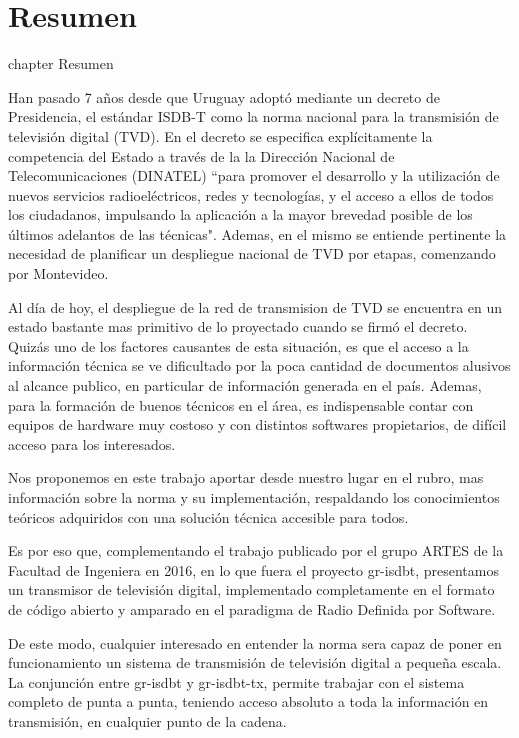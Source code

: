 \chapter*{Resumen}
 {chapter} {Resumen}%

Han pasado 7 años desde que Uruguay adoptó mediante un decreto de Presidencia, el estándar ISDB-T como la norma nacional para la transmisión de televisión digital (TVD). En el decreto se especifica explícitamente la competencia del Estado a través de la la Dirección Nacional de Telecomunicaciones (DINATEL) ``para promover el desarrollo y la utilización de nuevos servicios radioeléctricos, redes y tecnologías, y el acceso a ellos de todos los ciudadanos, impulsando la aplicación a la mayor brevedad posible de los últimos adelantos de las técnicas". Ademas, en el mismo se entiende pertinente la necesidad de planificar un despliegue nacional de TVD por etapas, comenzando por Montevideo.

Al día de hoy, el despliegue de la red de transmision de TVD se encuentra en un estado bastante mas primitivo de lo proyectado cuando se firmó el decreto. Quizás uno de los factores causantes de esta situación, es que el acceso a la información técnica se ve dificultado por la poca cantidad de documentos alusivos al alcance publico, en particular de información generada en el país. Ademas, para la formación de buenos técnicos en el área, es indispensable contar con equipos de hardware muy costoso y con distintos softwares propietarios, de difícil acceso para los interesados.

Nos proponemos en este trabajo aportar desde nuestro lugar en el rubro, mas información sobre la norma y su implementación, respaldando los conocimientos teóricos adquiridos con una solución técnica accesible para todos. 

Es por eso que, complementando el trabajo publicado por el grupo ARTES de la Facultad de Ingeniera en 2016, en lo que fuera el proyecto gr-isdbt, presentamos un transmisor de televisión digital, implementado completamente en el formato de código abierto y amparado en el paradigma de Radio Definida por Software. 

De este modo, cualquier interesado en entender la norma sera capaz de poner en funcionamiento un sistema de transmisión de televisión digital a pequeña escala. La conjunción entre gr-isdbt y gr-isdbt-tx, permite trabajar con el sistema completo de punta a punta, teniendo acceso absoluto a toda la información en transmisión, en cualquier punto de la cadena.